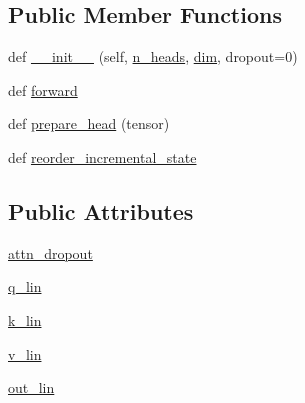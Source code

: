 \subsection*{Public Member Functions}
\begin{DoxyCompactItemize}
\item 
def \hyperlink{classparlai_1_1agents_1_1transformer_1_1modules_1_1MultiHeadAttention_a427b8cfaac6d37141555616d9cee8b74}{\+\_\+\+\_\+init\+\_\+\+\_\+} (self, \hyperlink{classparlai_1_1agents_1_1transformer_1_1modules_1_1MultiHeadAttention_aa28ff3887a718bb96a9bd27c938a0baf}{n\+\_\+heads}, \hyperlink{classparlai_1_1agents_1_1transformer_1_1modules_1_1MultiHeadAttention_a0ffd2e0d89db2f682561af438aaa1eb5}{dim}, dropout=0)
\item 
def \hyperlink{classparlai_1_1agents_1_1transformer_1_1modules_1_1MultiHeadAttention_a504eb3bb3e4b241e8461d78a0c3cbc03}{forward}
\item 
def \hyperlink{classparlai_1_1agents_1_1transformer_1_1modules_1_1MultiHeadAttention_aaaa65b1ea63856616e7b9d75b0e794a7}{prepare\+\_\+head} (tensor)
\item 
def \hyperlink{classparlai_1_1agents_1_1transformer_1_1modules_1_1MultiHeadAttention_a3478f15a48d749a3cbfe0760722b249c}{reorder\+\_\+incremental\+\_\+state}
\end{DoxyCompactItemize}
\subsection*{Public Attributes}
\begin{DoxyCompactItemize}
\item 
\hyperlink{classparlai_1_1agents_1_1transformer_1_1modules_1_1MultiHeadAttention_ac1c0169222b929c580d1a786479d7ed2}{attn\+\_\+dropout}
\item 
\hyperlink{classparlai_1_1agents_1_1transformer_1_1modules_1_1MultiHeadAttention_a84ab720bc232bb48e8f61e37e7c52323}{q\+\_\+lin}
\item 
\hyperlink{classparlai_1_1agents_1_1transformer_1_1modules_1_1MultiHeadAttention_a1e86cacd8fe8129222fe04c41c48655d}{k\+\_\+lin}
\item 
\hyperlink{classparlai_1_1agents_1_1transformer_1_1modules_1_1MultiHeadAttention_a1b1c33915c80f894221dfd4f0a0a2896}{v\+\_\+lin}
\item 
\hyperlink{classparlai_1_1agents_1_1transformer_1_1modules_1_1MultiHeadAttention_a495812bb583389a5f5dae989a22bda19}{out\+\_\+lin}
\end{DoxyCompactItemize}
